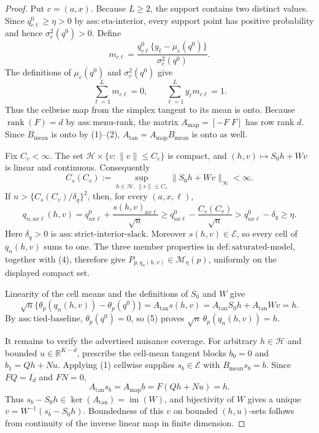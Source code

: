 \documentclass{article}
\begin{document}
\begin{proof}
Put \(c=(a,x)\). Because \(L\ge2\), the support contains two distinct values. Since \(q^0_{c\ell}\ge\eta>0\) by \(\mathrm{ass:eta\text{-}interior}\), every support point has positive probability and hence \(\sigma_c^2(q^0)>0\). Define
\[
m_{c\ell}=\frac{q^0_{c\ell}\{y_\ell-\mu_c(q^0)\}}{\sigma_c^2(q^0)}.
\tag{1}
\]
The definitions of \(\mu_c(q^0)\) and \(\sigma_c^2(q^0)\) give
\[
\sum_{\ell=1}^L m_{c\ell}=0,
\qquad
\sum_{\ell=1}^L y_\ell m_{c\ell}=1.
\tag{2}
\]
Thus the cellwise map from the simplex tangent to its mean is onto. Because \(\operatorname{rank}(F)=d\) by \(\mathrm{ass:menu\text{-}rank}\), the matrix \(A_{\mathrm{map}}=[-F\;F]\) has row rank \(d\). Since \(B_{\mathrm{mean}}\) is onto by (1)--(2), \(A_{\mathrm{tan}}=A_{\mathrm{map}}B_{\mathrm{mean}}\) is onto as well.

Fix \(C_v<\infty\). The set \(\mathcal H\times\{v:\lVert v\rVert\le C_v\}\) is compact, and \((h,v)\mapsto S_0h+Wv\) is linear and continuous. Consequently
\[
C_s(C_v):=\sup_{h\in\mathcal H,\,\lVert v\rVert\le C_v}
\lVert S_0h+Wv\rVert_\infty<\infty.
\tag{3}
\]
If \(n>\{C_s(C_v)/\delta_q\}^2\), then, for every \((a,x,\ell)\),
\[
q_{n,ax\ell}(h,v)
=q^0_{ax\ell}+\frac{s(h,v)_{ax\ell}}{\sqrt n}
\ge q^0_{ax\ell}-\frac{C_s(C_v)}{\sqrt n}
>q^0_{ax\ell}-\delta_q\ge\eta.
\tag{4}
\]
Here \(\delta_q>0\) is \(\mathrm{ass:strict\text{-}interior\text{-}slack}\). Moreover \(s(h,v)\in\mathcal E\), so every cell of \(q_n(h,v)\) sums to one. The three member properties in \(\mathrm{def:saturated\text{-}model}\), together with (4), therefore give \(P_{p,q_n(h,v)}\in\mathcal M_\eta(p)\), uniformly on the displayed compact set.

Linearity of the cell means and the definitions of \(S_0\) and \(W\) give
\[
\sqrt n\{\theta_p(q_n(h,v))-\theta_p(q^0)\}
=A_{\mathrm{tan}}s(h,v)
=A_{\mathrm{tan}}S_0h+A_{\mathrm{tan}}Wv=h.
\tag{5}
\]
By \(\mathrm{ass:tied\text{-}baseline}\), \(\theta_p(q^0)=0\), so (5) proves \(\sqrt n\,\theta_p(q_n(h,v))=h\).

It remains to verify the advertised nuisance coverage. For arbitrary \(h\in\mathcal H\) and bounded \(u\in\mathbb R^{K-d}\), prescribe the cell-mean tangent blocks \(b_0=0\) and \(b_1=Qh+Nu\). Applying (1) cellwise supplies \(s_b\in\mathcal E\) with \(B_{\mathrm{mean}}s_b=b\). Since \(FQ=I_d\) and \(FN=0\),
\[
A_{\mathrm{tan}}s_b=A_{\mathrm{map}}b=F(Qh+Nu)=h.
\]
Thus \(s_b-S_0h\in\ker(A_{\mathrm{tan}})=\operatorname{im}(W)\), and bijectivity of \(W\) gives a unique \(v=W^{-1}(s_b-S_0h)\). Boundedness of this \(v\) on bounded \((h,u)\)-sets follows from continuity of the inverse linear map in finite dimension.


\end{proof}
\end{document}
